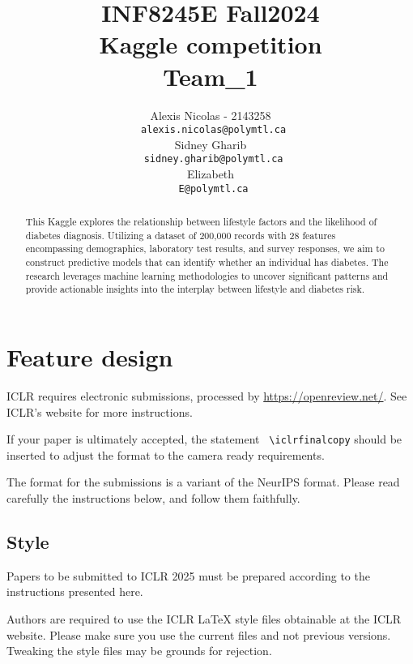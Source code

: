 \documentclass{article} %
\title{INF8245E Fall2024  \\ Kaggle competition \\ Team\_1 }
\author{Alexis Nicolas - 2143258 \\
\texttt{\ alexis.nicolas@polymtl.ca} \\
\And
Sidney Gharib \\
\texttt{\ sidney.gharib@polymtl.ca} \\
\And
Elizabeth \\
\texttt{\ E@polymtl.ca} \\
}
\begin{document}
\maketitle

\begin{abstract}
This Kaggle explores the relationship between lifestyle factors and the likelihood of diabetes diagnosis.
Utilizing a dataset of 200,000 records with 28 features encompassing demographics,
laboratory test results, and survey responses, we aim to construct predictive models that can identify whether an individual has diabetes.
The research leverages machine learning methodologies to uncover significant patterns and provide actionable insights into the interplay between lifestyle and diabetes risk.
\end{abstract}

\section{Feature design}

ICLR requires electronic submissions, processed by
\url{https://openreview.net/}. See ICLR's website for more instructions.

If your paper is ultimately accepted, the statement {\tt
  {\textbackslash}iclrfinalcopy} should be inserted to adjust the
format to the camera ready requirements.

The format for the submissions is a variant of the NeurIPS format.
Please read carefully the instructions below, and follow them
faithfully.

\subsection{Style}

Papers to be submitted to ICLR 2025 must be prepared according to the
instructions presented here.


Authors are required to use the ICLR \LaTeX{} style files obtainable at the
ICLR website. Please make sure you use the current files and
not previous versions. Tweaking the style files may be grounds for rejection.
\end{document}
